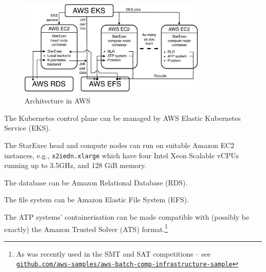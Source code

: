 \documentclass{easychair}
\newenvironment{packed_itemize}{
\vspace*{-0.3em}
\begin{itemize}
\setlength{\partopsep}{0pt}
\setlength{\itemsep}{1pt}
\setlength{\parskip}{0pt}
\setlength{\parsep}{0pt}
}{\end{itemize}}
\newcommand{\dav}[1]{{\color{red}{David: {#1}}}}
\begin{document}
\begin{figure}[htb]
\begin{center}
\includegraphics[width=0.8\textwidth]{ArchitectureAWS}
\caption{Architecture in AWS}
\label{ArchitectureAWS}
\end{center}
\end{figure}
\begin{packed_itemize}
	
\item The Kubernetes control plane can be managed by AWS Elastic Kubernetes Service (EKS).
\item The StarExec head and compute nodes can run on suitable Amazon EC2 instances, e.g., {\tt x2iedn.xlarge} which have four Intel Xeon Scalable vCPUs running up to 3.5GHz, and 128 GiB memory.
\item The database can be Amazon Relational Database (RDS).
\item The file system can be Amazon Elastic File System (EFS).
\item The ATP systems' containerisation can be made compatible with (possibly be exactly) the 
      Amazon Trusted Solver (ATS) format.\footnote{%
      As was recently used in the SMT and SAT competitions -- see \\
      \href{https://github.com/aws-samples/aws-batch-comp-infrastructure-sample}
      {\tt github.com/aws-samples/aws-batch-comp-infrastructure-sample}}
\end{packed_itemize}
\end{document}
